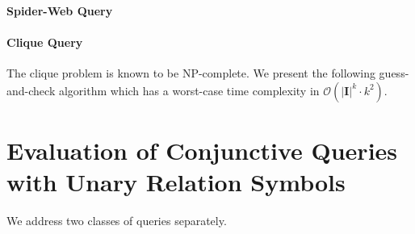 \documentclass[a4paper,12pt]{article}
\begin{document}
\paragraph{Spider-Web Query}{
}

\paragraph{Clique Query}{The clique problem is known to be NP-complete. We present the following guess-and-check algorithm which has a worst-case time complexity in $\mathcal{O}(|\mathbf{I}|^k \cdot k^2)$.}

\section{Evaluation of Conjunctive Queries with Unary Relation Symbols}

We address two classes of queries separately.
\end{document}

